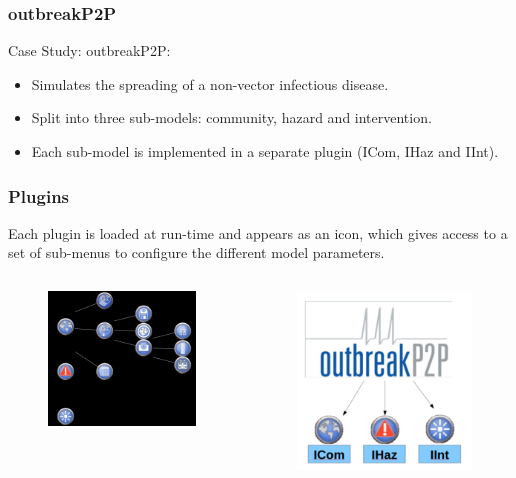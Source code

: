 \documentclass[hyperref={pdfpagelabels=true}]{beamer}
\begin{document}
\begin{frame}
\frametitle{outbreakP2P}
Case Study: outbreakP2P:
\begin{itemize}
\item Simulates the spreading of a non-vector infectious disease.
\item Split into three sub-models: community, hazard and intervention.
\item Each sub-model is implemented in a separate plugin (ICom, IHaz and IInt).
\end{itemize}
\end{frame}

\begin{frame}
\frametitle{Plugins}
Each plugin is loaded at run-time and appears as an icon, which gives access to a set of sub-menus to configure the different model parameters.

\begin{columns}
  \begin{column}{5cm}
    \begin{figure}
    \includegraphics[scale=0.4]{icons.png}
    \end{figure}
  \end{column}
  \begin{column}{5cm}
    \begin{figure}
    \includegraphics[scale=0.8]{plugins3.png}
    \end{figure}
  \end{column}  
\end{columns}

\end{frame}
\end{document}
